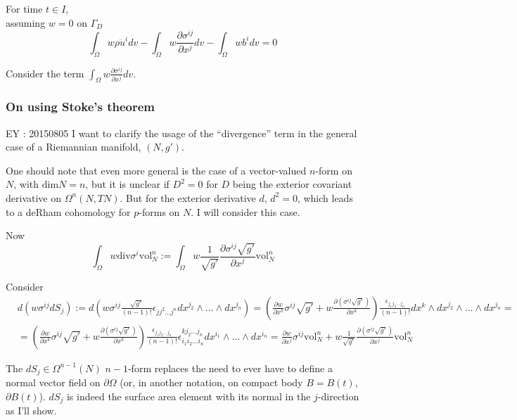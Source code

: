 \documentclass[twoside,landscape,10pt]{amsart}
\theoremstyle{plain}
\theoremstyle{definition}
\theoremstyle{remark}
\begin{document}
\begin{multicols*}{2}
For time $t\in I$, \\
assuming $w=0$ on $\Gamma_D$ 
\[
\int_{\Omega} w \rho \ddot{u}^idv - \int_{\Omega} w \frac{ \partial \sigma^{ij}}{ \partial x^j} dv - \int_{\Omega} w b^i dv = 0 
\]

Consider the term $\int_{\Omega} w \frac{ \partial \sigma^{ij}}{ \partial x^j} dv$.  

\subsubsection{On using Stoke's theorem}

EY : 20150805 I want to clarify the usage of the ``divergence'' term in the general case of a Riemannian manifold, $(N,g')$.  

One should note that even more general is the case of a vector-valued $n$-form on $N$, with $\text{dim}N=n$, but it is unclear if $D^2=0$ for $D$ being the exterior covariant derivative on $\Omega^n(N,TN)$.  But for the exterior derivative $d$, $d^2=0$, which leads to a deRham cohomology for $p$-forms on $N$.  I will consider this case.

Now
\[
\int_{\Omega} w \text{div}\sigma^i \text{vol}^n_N := \int_{\Omega} w \frac{1}{\sqrt{g'}} \frac{ \partial \sigma^{ij} \sqrt{g'} }{ \partial x^j} \text{vol}^n_N
\]

Consider
\[
\begin{aligned}
  & d(w \sigma^{ij}dS_j) := d(w \sigma^{ij} \frac{\sqrt{g'}}{ (n-1)!} \epsilon_{jj^2\dots j^n} dx^{j_2} \wedge \dots \wedge dx^{j_n} ) = \left( \frac{ \partial w }{ \partial x^k } \sigma^{ij} \sqrt{g'} + w \frac{ \partial (\sigma^{ij} \sqrt{g'})}{ \partial x^k} \right) \frac{ \epsilon_{j_1j_2 \dots j_n}}{ (n-1)!} dx^k \wedge dx^{j_2} \wedge \dots \wedge dx^{j_n} = \\
  & = \left( \frac{ \partial w}{ \partial x^k} \sigma^{ij} \sqrt{g'} + w \frac{ \partial (\sigma^{ij} \sqrt{g'})}{ \partial x^k} \right) \frac{ \epsilon_{j_1j_2 \dots j_n}}{(n-1)!} \epsilon^{kj_2 \dots j_n}_{i_1 i_2 \dots i_n} dx^{i_1} \wedge \dots \wedge dx^{i_n} = \frac{ \partial w}{\partial x^j} \sigma^{ij} \text{vol}_N^n + w \frac{1}{\sqrt{g'}} \frac{ \partial (\sigma^{ij} \sqrt{g'})}{ \partial x^j} \text{vol}_N^n
\end{aligned}
\]

The $dS_j \in \Omega^{n-1}(N)$ $n-1$-form replaces the need to ever have to define a normal vector field on $\partial \Omega$ (or, in another notation, on compact body $B=B(t)$, $\partial B(t)$).  $dS_j$ is indeed the surface area element with its normal in the $j$-direction as I'll show.  


\end{multicols*}
\end{document}
